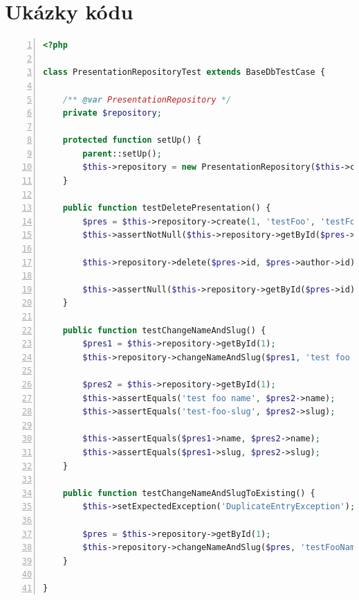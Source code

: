 \documentclass[11pt,twoside,a4paper]{book}
\begin{document}

{
\def\CS{$\cal C\kern-0.1667em\lower.5ex\hbox{$\cal S$}\kern-0.075em $}

}




\appendix	

\printnomenclature

\chapter{Ukázky kódu}\label{chap:ukazkykodu}


\begin{lstlisting}[caption={Ukázka integračních testů},label={lst:integrationtest},
language=php,
numbers=left,
breaklines=true]
<?php

class PresentationRepositoryTest extends BaseDbTestCase {

	/** @var PresentationRepository */
	private $repository;

	protected function setUp() {
		parent::setUp();
		$this->repository = new PresentationRepository($this->container->database);
	}

	public function testDeletePresentation() {
		$pres = $this->repository->create(1, 'testFoo', 'testFoo');
		$this->assertNotNull($this->repository->getById($pres->id));

		$this->repository->delete($pres->id, $pres->author->id);

		$this->assertNull($this->repository->getById($pres->id));
	}

	public function testChangeNameAndSlug() {
		$pres1 = $this->repository->getById(1);
		$this->repository->changeNameAndSlug($pres1, 'test foo name', 'test foo slug');

		$pres2 = $this->repository->getById(1);
		$this->assertEquals('test foo name', $pres2->name);
		$this->assertEquals('test-foo-slug', $pres2->slug);

		$this->assertEquals($pres1->name, $pres2->name);
		$this->assertEquals($pres1->slug, $pres2->slug);
	}

	public function testChangeNameAndSlugToExisting() {
		$this->setExpectedException('DuplicateEntryException');

		$pres = $this->repository->getById(1);
		$this->repository->changeNameAndSlug($pres, 'testFooName', 'test2');
	}

}
\end{lstlisting}

\newpage
\end{document}
